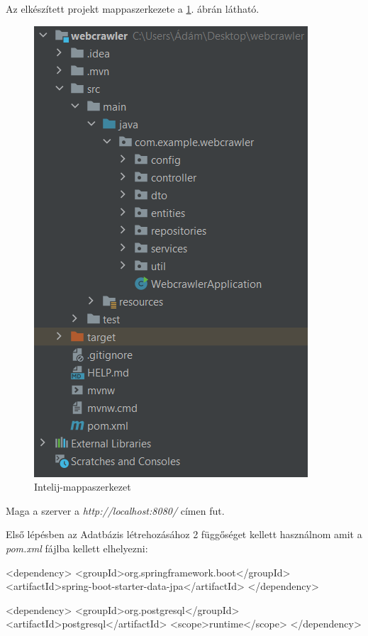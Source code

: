 Az elkészített projekt mappaszerkezete a \ref{fig:Intelij-mappaszerkezet}. ábrán látható.
\begin{figure}[h]
\centering
\includegraphics[scale=0.7]{images/Intelij-mappaszerkezet.png}
\caption{Intelij-mappaszerkezet}
\label{fig:Intelij-mappaszerkezet}
\end{figure}

Maga a szerver a \textit{http://localhost:8080/} címen fut.


Első lépésben az Adatbázis létrehozásához 2 függőséget kellett használnom amit a \textit{pom.xml} fájlba kellett elhelyezni:
\begin{java}
<dependency>
	<groupId>org.springframework.boot</groupId>
	<artifactId>spring-boot-starter-data-jpa</artifactId>
</dependency>

<dependency>
	<groupId>org.postgresql</groupId>
	<artifactId>postgresql</artifactId>
	<scope>runtime</scope>
</dependency>
\end{java}

